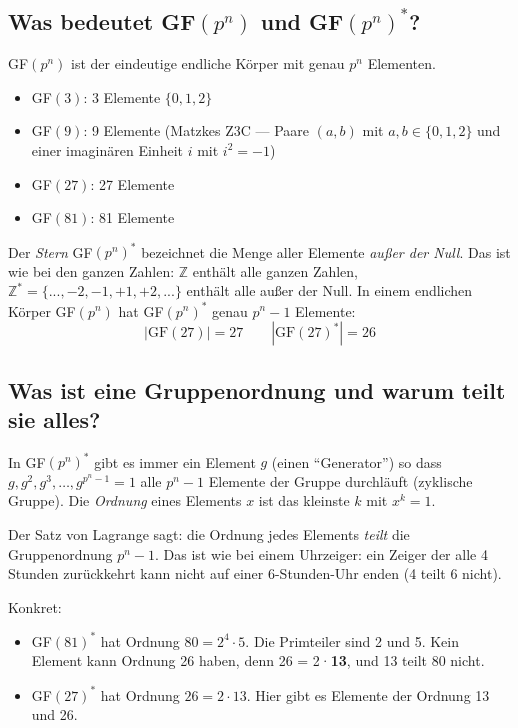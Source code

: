 \subsection*{Was bedeutet GF$(p^n)$ und GF$(p^n)^*$?}

GF$(p^n)$ ist der eindeutige endliche Körper mit genau $p^n$ Elementen.
\begin{itemize}
  \item GF$(3)$: 3 Elemente $\{0,1,2\}$
  \item GF$(9)$: 9 Elemente (Matzkes Z3C — Paare $(a,b)$ mit $a,b \in \{0,1,2\}$
        und einer imagin{\"a}ren Einheit $i$ mit $i^2 = -1$)
  \item GF$(27)$: 27 Elemente
  \item GF$(81)$: 81 Elemente
\end{itemize}

Der \emph{Stern} GF$(p^n)^*$ bezeichnet die Menge aller Elemente \emph{außer der Null}.
Das ist wie bei den ganzen Zahlen: $\mathbb{Z}$ enthält alle ganzen Zahlen,
$\mathbb{Z}^* = \{..., -2, -1, +1, +2, ...\}$ enthält alle außer der Null.
In einem endlichen Körper GF$(p^n)$ hat GF$(p^n)^*$ genau $p^n - 1$ Elemente:
\begin{equation*}
  |\text{GF}(27)| = 27 \qquad |\text{GF}(27)^*| = 26
\end{equation*}

\subsection*{Was ist eine Gruppenordnung und warum teilt sie alles?}

In GF$(p^n)^*$ gibt es immer ein Element $g$ (einen ``Generator'') so dass
$g, g^2, g^3, \ldots, g^{p^n-1} = 1$ alle $p^n - 1$ Elemente der Gruppe durchläuft
(zyklische Gruppe). Die \emph{Ordnung} eines Elements $x$ ist das kleinste $k$ mit $x^k = 1$.

Der Satz von Lagrange sagt: die Ordnung jedes Elements \emph{teilt} die Gruppenordnung $p^n - 1$.
Das ist wie bei einem Uhrzeiger: ein Zeiger der alle 4 Stunden zurückkehrt kann nicht
auf einer 6-Stunden-Uhr enden (4 teilt 6 nicht).

Konkret:
\begin{itemize}
  \item GF$(81)^*$ hat Ordnung $80 = 2^4 \cdot 5$. Die Primteiler sind 2 und 5.
        Kein Element kann Ordnung 26 haben, denn 26 = 2·\textbf{13}, und 13 teilt 80 nicht.
  \item GF$(27)^*$ hat Ordnung $26 = 2 \cdot 13$. Hier gibt es Elemente der Ordnung 13 und 26.
\end{itemize}

